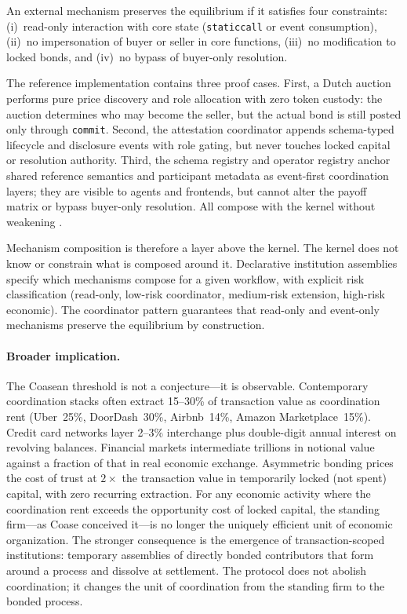 \documentclass[11pt,a4paper]{article}
\theoremstyle{definition}
\theoremstyle{remark}
\begin{document}
An external mechanism preserves the equilibrium if it satisfies four
constraints: (i)~read-only interaction with core state
(\texttt{staticcall} or event consumption), (ii)~no impersonation of
buyer or seller in core functions, (iii)~no modification to locked
bonds, and (iv)~no bypass of buyer-only resolution.

The reference implementation contains three proof cases. First, a Dutch
auction performs pure price discovery and role allocation with zero
token custody: the auction determines who may become the seller, but the
actual bond is still posted only through \texttt{commit}. Second, the
attestation coordinator appends schema-typed lifecycle and disclosure
events with role gating, but never touches locked capital or resolution
authority. Third, the schema registry and operator registry anchor
shared reference semantics and participant metadata as event-first
coordination layers; they are visible to agents and frontends, but
cannot alter the payoff matrix or bypass buyer-only resolution. All
compose with the kernel without weakening .

Mechanism composition is therefore a layer above the kernel. The kernel
does not know or constrain what is composed around it. Declarative
institution assemblies specify which mechanisms compose for a given
workflow, with explicit risk classification (read-only, low-risk
coordinator, medium-risk extension, high-risk economic). The
coordinator pattern guarantees that read-only and event-only mechanisms
preserve the equilibrium by construction.

\paragraph{Broader implication.}
The Coasean threshold is not a conjecture---it is observable.
Contemporary coordination stacks often extract 15--30\% of transaction
value as coordination rent (Uber~25\%, DoorDash~30\%, Airbnb~14\%,
Amazon Marketplace~15\%).
Credit card networks layer 2--3\% interchange plus double-digit annual
interest on revolving balances. Financial markets intermediate
trillions in notional value against a fraction of that in real economic
exchange. Asymmetric bonding prices the cost of trust at $2\times$ the
transaction value in temporarily locked (not spent) capital, with zero
recurring extraction. For any economic activity where the coordination
rent exceeds the opportunity cost of locked capital, the standing
firm---as Coase conceived it---is no longer the uniquely efficient unit
of economic organization. The stronger consequence is the emergence of
transaction-scoped institutions: temporary assemblies of directly
bonded contributors that form around a process and dissolve at
settlement. The protocol does not abolish coordination; it changes the
unit of coordination from the standing firm to the bonded process.
\end{document}

